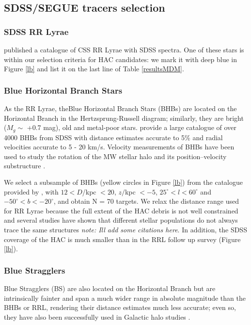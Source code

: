 \documentclass[useAMS,usenatbib]{mn2e}
\begin{document}
\subsection{SDSS/SEGUE tracers selection} 
\subsubsection{SDSS RR Lyrae}
\citet{Drake2013a} published a catalogue of CSS RR Lyrae with SDSS spectra. One of these stars is within our selection criteria for HAC candidates: we mark it with deep blue in Figure \ref{lb} and list it on the last line of Table \ref{resultsMDM}. 

\subsubsection{Blue Horizontal Branch Stars}
As the RR Lyrae, theBlue Horizontal Branch Stars (BHBs) are located on the Horizontal Branch in the Hertzsprung-Russell diagram; similarly, they are bright  ($M_{g} \sim$ +0.7 mag), old and metal-poor stars. \citealt{Xu11} provide a large catalogue of over 4000 BHBs from SDSS with distance estimates accurate to 5\% and radial velocities accurate to 5 - 20 km/s. Velocity measurements of BHBs have been used to study the rotation of the MW stellar halo \citep{Fermani2013}
and its position--velocity substructure \citep{Xu11}.

We select a subsample of BHBs (yellow circles in Figure \ref{lb}) from the catalogue provided by \citet{Xu11}, with $12 < D$/kpc $<20$, $z/$kpc $< -5$, $25^{\circ}<l<60^{\circ}$ and $-50^{\circ}<b<-20^{\circ}$, and obtain N = 70 targets. We relax the distance range used for RR Lyrae because the full extent of the HAC debris is not well constrained and several studies have shown that different stellar populations do not always trace the same structures \textit{note: Ill add some citations here}. In addition, the SDSS coverage of the HAC is much smaller than in the RRL follow up survey (Figure \ref{lb}).
%
\subsubsection{Blue Stragglers}
Blue Stragglers (BS) are also located on the Horizontal Branch but are intrinsically fainter and span a much wider range in absolute magnitude than the BHBs or RRL, rendering their distance estimates much less accurate; even so, they have also been successfully used in Galactic halo studies \citep[e.g.][]{De11}. 
\end{document}
